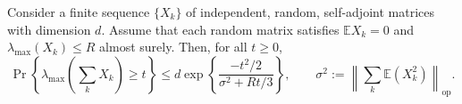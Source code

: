 Consider a finite sequence \(\{X_k\}\) of independent, random, self-adjoint matrices with dimension \(d\). Assume that each random matrix satisfies \(\mathbb E X_k=0\) and \(\lambda_{\max}(X_k)\leq R\) almost surely. Then, for all \(t\geq0\),
\[
\Pr\!\left\{\lambda_{\max}\!\left(\sum_k X_k\right)\geq t\right\}
\leq d\exp\!\left\{\frac{-t^2/2}{\sigma^2+Rt/3}\right\},
\qquad
\sigma^2:=\left\|\sum_k\mathbb E(X_k^2)\right\|_{\mathrm{op}}.
\]